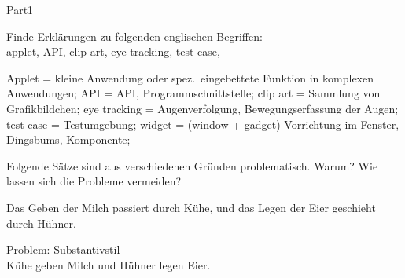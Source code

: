 \documentclass[a4paper,twoside]{article}
\begin{document}
\begin{exam}[Teil I.]{Part1}
\begin{problem}[3]
Finde Erklärungen zu folgenden englischen Begriffen:\\
applet, %
API, %
clip art, %
eye tracking, %
test case, %

\begin{solution}
Applet = kleine Anwendung oder spez.\ eingebettete Funktion in komplexen Anwendungen;
API = API, Programmschnittstelle;
clip art = Sammlung von Grafikbildchen;
eye tracking = Augenverfolgung, Bewegungserfassung der Augen;
test case =  Testumgebung;
widget = (window + gadget)  Vorrichtung im Fenster, Dingsbums, Komponente;
\end{solution}
\end{problem}

% 
% 
% 



\begin{instructions}[Sätze]
Folgende Sätze sind aus verschiedenen Gründen problematisch. Warum? Wie lassen
sich die Probleme vermeiden?
\end{instructions}

\begin{problem}[3]
Das Geben der Milch passiert durch Kühe, und das Legen der Eier
geschieht durch Hühner.
\begin{solution}
Problem: Substantivstil\\
Kühe geben Milch und Hühner legen Eier.
\end{solution}
\end{problem}



\end{exam}
\end{document}
